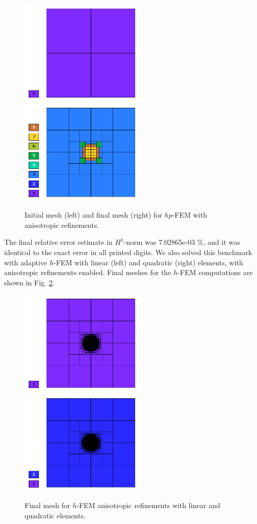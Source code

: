 \begin{figure}[!ht]
\centering
\includegraphics[height=5cm]{nist/nist-4/mesh_hp_aniso_init.png}\ \
\includegraphics[height=5cm]{nist/nist-4/mesh_hp_aniso.png}
\vspace{-2mm}
\caption{Initial mesh (left) and final mesh (right) for $hp$-FEM with anisotropic refinements.}
\label{fig:nist-4-hp-aniso}
\end{figure}

The final relative error estimate in $H^1$-norm was 7.02865e-03 \%,
and it was identical to the exact error in all printed digits.
We also solved this benchmark with adaptive $h$-FEM
with linear (left) and quadratic (right)
elements, with anisotropic refinements enabled.
Final meshes for the $h$-FEM computations are shown
in Fig. \ref{fig:nist-4-h-aniso}.

\begin{figure}[!ht]
\centering
\includegraphics[height=5cm]{nist/nist-4/mesh_h1_aniso.png}\ \
\includegraphics[height=5cm]{nist/nist-4/mesh_h2_aniso.png}
\vspace{-2mm}
\caption{Final mesh for $h$-FEM anisotropic refinements with linear and quadratic elements.}
\label{fig:nist-4-h-aniso}
\end{figure}


